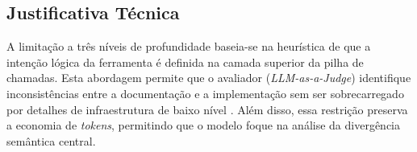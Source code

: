 \subsection*{Justificativa Técnica}
A limitação a três níveis de profundidade baseia-se na heurística de que a intenção lógica da ferramenta é definida na camada superior da pilha de chamadas. Esta abordagem permite que o avaliador (\textit{LLM-as-a-Judge}) identifique inconsistências entre a documentação e a implementação sem ser sobrecarregado por detalhes de infraestrutura de baixo nível \cite{shi2026description}. Além disso, essa restrição preserva a economia de \textit{tokens}, permitindo que o modelo foque na análise da divergência semântica central.
